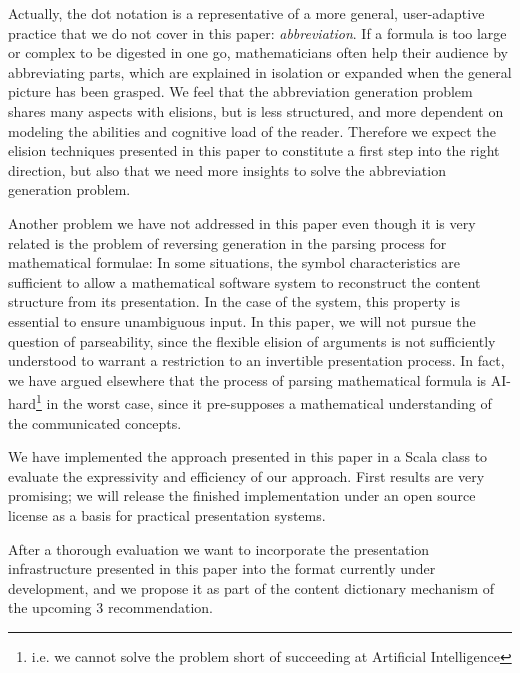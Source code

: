 Actually, the dot notation is a representative of a more general, user-adaptive practice
that we do not cover in this paper: {\emph{abbreviation}}. If a formula is too large or
complex to be digested in one go, mathematicians often help their audience by abbreviating
parts, which are explained in isolation or expanded when the general picture has been
grasped. We feel that the abbreviation generation problem shares many aspects with
elisions, but is less structured, and more dependent on modeling the abilities and
cognitive load of the reader. Therefore we expect the elision techniques presented in this
paper to constitute a first step into the right direction, but also that we need more
insights to solve the abbreviation generation problem.

Another problem we have not addressed in this paper even though it is very related is the
problem of reversing generation in the parsing process for mathematical formulae: In some situations, the symbol
characteristics are sufficient to allow a mathematical software system to reconstruct the
content structure from its presentation. In the case of the {\isabelle} system, this
property is essential to ensure unambiguous input. In this paper, we will not pursue the
question of parseability, since the flexible elision of arguments is not sufficiently
understood to warrant a restriction to an invertible presentation process. In fact, we
have argued elsewhere\cite{Kohlhase04:stex} that the process of parsing mathematical
formula is AI-hard\footnote{i.e. we cannot solve the problem short of succeeding at
  Artificial Intelligence} in the worst case, since it pre-supposes a mathematical
understanding of the communicated concepts.

We have implemented the approach presented in this paper in a Scala class to evaluate the expressivity and efficiency of our approach.
First results are very promising; we will release the finished implementation under an
open source license as a basis for practical presentation systems.

After a thorough evaluation we want to incorporate the presentation infrastructure
presented in this paper into the {} format currently under development, and we
propose it as part of the content dictionary mechanism of the upcoming {\mathml}3
recommendation.


